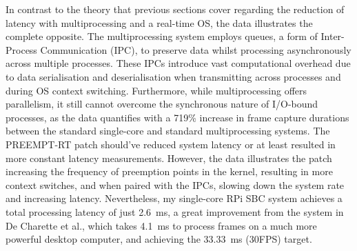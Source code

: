 In contrast to the theory that previous sections cover regarding the reduction of latency with multiprocessing and a real-time OS, the data illustrates the complete opposite. The multiprocessing system employs queues, a form of Inter-Process Communication (IPC), to preserve data whilst processing asynchronously across multiple processes. These IPCs introduce vast computational overhead due to data serialisation and deserialisation when transmitting across processes and during OS context switching. Furthermore, while multiprocessing offers parallelism, it still cannot overcome the synchronous nature of I/O-bound processes, as the data quantifies with a 719\% increase in frame capture durations between the standard single-core and standard multiprocessing systems. The PREEMPT-RT patch should've reduced system latency or at least resulted in more constant latency measurements. However, the data illustrates the patch increasing the frequency of preemption points in the kernel, resulting in more context switches, and when paired with the IPCs, slowing down the system rate and increasing latency. Nevertheless, my single-core RPi SBC system achieves a total processing latency of just \SI{2.6}{\milli\second}, a great improvement from the system in De Charette et al., which takes \SI{4.1}{\milli\second} to process frames on a much more powerful desktop computer, and achieving the \SI{33.33}{\milli\second} (30FPS) target.

